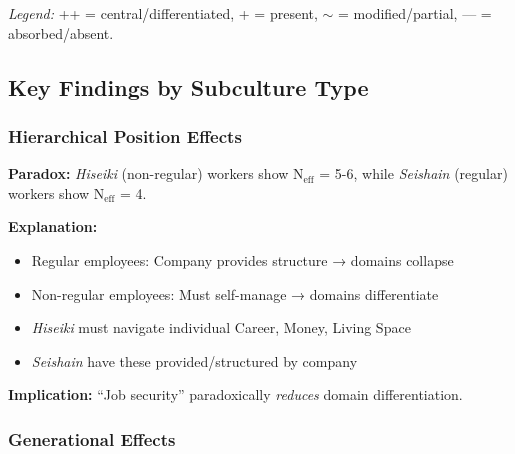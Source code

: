 \textit{Legend:} ++ = central/differentiated, + = present, $\sim$ = modified/partial, — = absorbed/absent.

\subsection{Key Findings by Subculture Type}

\subsubsection{Hierarchical Position Effects}

\begin{tcolorbox}[colback=orange!5!white, colframe=orange!75!black, title=Finding: Non-Regular Workers Show MORE Domain Differentiation]

\textbf{Paradox:} \textit{Hiseiki} (non-regular) workers show N$_{\text{eff}}$ = 5-6, while \textit{Seishain} (regular) workers show N$_{\text{eff}}$ = 4.

\textbf{Explanation:}
\begin{itemize}[nosep]
\item Regular employees: Company provides structure → domains collapse
\item Non-regular employees: Must self-manage → domains differentiate
\item \textit{Hiseiki} must navigate individual Career, Money, Living Space
\item \textit{Seishain} have these provided/structured by company
\end{itemize}

\textbf{Implication:} ``Job security'' paradoxically \textit{reduces} domain differentiation.

\end{tcolorbox}

\subsubsection{Generational Effects}

